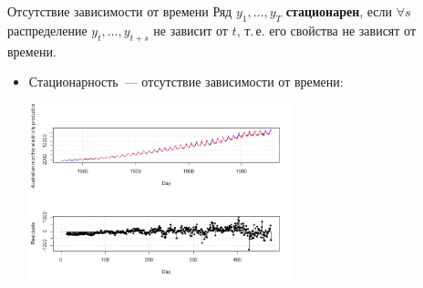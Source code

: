 \documentclass[10pt,pdf,utf8,hyperref={unicode},aspectratio=169]{beamer}
\begin{document}
\begin{frame}{Отсутствие зависимости от времени}
Ряд $y_1,\dots,y_T$ \textbf{стационарен}, если $\forall s$ распределение $y_t,\dots,y_{t+s}$ не зависит от $t$, т.\,е. его свойства не зависят от времени.
		\begin{itemize}
			\item Стационарность~--- отсутствие зависимости от времени:
			\begin{center}
				\includegraphics[width=0.6\textwidth]{trended.png}			
			\end{center}		
		\end{itemize}		
		
\end{frame}
\end{document}
